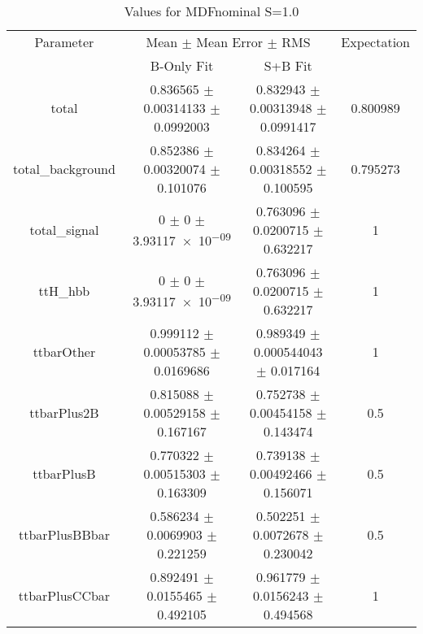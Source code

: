 \begin{table}
\centering
\caption{Values for MDFnominal S=1.0}
\begin{tabular}{cccc}
\toprule
Parameter & \multicolumn{2}{c}{Mean $\pm$ Mean Error $\pm$ RMS} & Expectation\\
 & B-Only Fit & S+B Fit & \\
\midrule
total & \num{0.836565} $\pm$ \num{0.00314133} $\pm$ \num{0.0992003} & \num{0.832943} $\pm$ \num{0.00313948} $\pm$ \num{0.0991417} & \num{0.800989}\\
total\_background & \num{0.852386} $\pm$ \num{0.00320074} $\pm$ \num{0.101076} & \num{0.834264} $\pm$ \num{0.00318552} $\pm$ \num{0.100595} & \num{0.795273}\\
total\_signal & \num{0} $\pm$ \num{0} $\pm$ \num{3.93117e-09} & \num{0.763096} $\pm$ \num{0.0200715} $\pm$ \num{0.632217} & \num{1}\\
ttH\_hbb & \num{0} $\pm$ \num{0} $\pm$ \num{3.93117e-09} & \num{0.763096} $\pm$ \num{0.0200715} $\pm$ \num{0.632217} & \num{1}\\
ttbarOther & \num{0.999112} $\pm$ \num{0.00053785} $\pm$ \num{0.0169686} & \num{0.989349} $\pm$ \num{0.000544043} $\pm$ \num{0.017164} & \num{1}\\
ttbarPlus2B & \num{0.815088} $\pm$ \num{0.00529158} $\pm$ \num{0.167167} & \num{0.752738} $\pm$ \num{0.00454158} $\pm$ \num{0.143474} & \num{0.5}\\
ttbarPlusB & \num{0.770322} $\pm$ \num{0.00515303} $\pm$ \num{0.163309} & \num{0.739138} $\pm$ \num{0.00492466} $\pm$ \num{0.156071} & \num{0.5}\\
ttbarPlusBBbar & \num{0.586234} $\pm$ \num{0.0069903} $\pm$ \num{0.221259} & \num{0.502251} $\pm$ \num{0.0072678} $\pm$ \num{0.230042} & \num{0.5}\\
ttbarPlusCCbar & \num{0.892491} $\pm$ \num{0.0155465} $\pm$ \num{0.492105} & \num{0.961779} $\pm$ \num{0.0156243} $\pm$ \num{0.494568} & \num{1}\\
\bottomrule
\end{tabular}
\end{table}